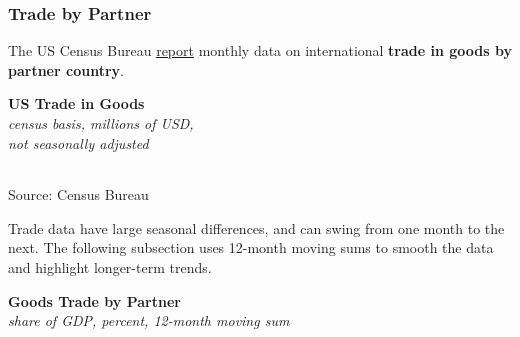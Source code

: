 \documentclass{report}
\begin{document}
{\begin{minipage}{0.76\textwidth} 
\subsubsection*{Trade by Partner} 
\small The US Census Bureau \href{https://www.census.gov/foreign-trade/data/index.html}{report} monthly data on international \textbf{trade in goods by partner country}.  
\vspace{1.5mm}

\normalsize \textbf{US Trade in Goods} \hspace{12mm}  \hspace{16mm} \\
\footnotesize{\textit{census basis, millions of USD,}}\\
\footnotesize{\textit{not seasonally adjusted}}\\
 \setlength{\tabcolsep}{3.2pt} \color{black!90}
	{\renewcommand{\arraystretch}{1.5}
\hspace*{-2mm} \begin{tabular}{p{28mm} R{12mm} R{12mm} R{12mm} R{14.5mm} R{12mm} R{12mm}}
			  \hline
		\end{tabular}}	
\vspace*{-2mm}	
	
\footnotesize{Source: Census Bureau}
\vspace{0.5mm}

\small 

Trade data have large seasonal differences, and can swing from one month to the next. The following subsection uses 12-month moving sums to smooth the data and highlight longer-term trends.
\end{minipage}
\newpage
\vspace*{-9mm}  

\begin{minipage}{0.79\textwidth}
\small 
\vspace{1mm}

\normalsize \textbf{Goods Trade by Partner}\\
\footnotesize{\textit{share of GDP, percent, 12-month moving sum}}
\vspace{3.35cm}


\end{minipage}}
\end{document}
